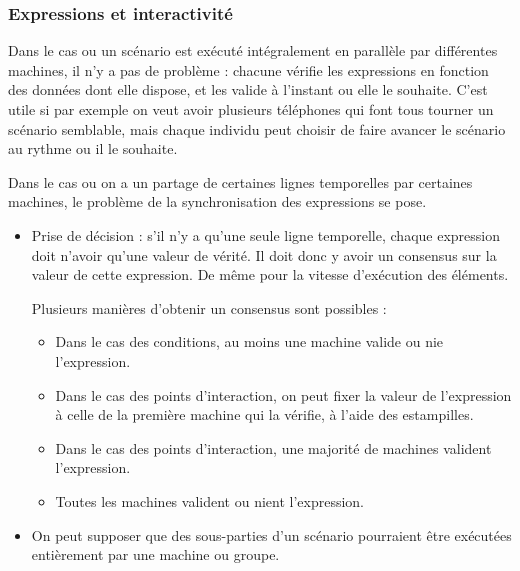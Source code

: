 \documentclass{article}
\begin{document}
\subsubsection{Expressions et interactivité}
Dans le cas ou un scénario est exécuté intégralement en parallèle par différentes machines, il n'y a pas de problème : chacune vérifie les expressions en fonction des données dont elle dispose, et les valide à l'instant ou elle le souhaite. C'est utile si par exemple on veut avoir plusieurs téléphones qui font tous tourner un scénario semblable, mais chaque individu peut choisir de faire avancer le scénario au rythme ou il le souhaite.

Dans le cas ou on a un partage de certaines lignes temporelles par certaines machines, le problème de la synchronisation des expressions se pose.

\begin{itemize}
	\item Prise de décision : s'il n'y a qu'une seule ligne temporelle, chaque expression doit n'avoir qu'une valeur de vérité. Il doit donc y avoir un consensus sur la valeur de cette expression. De même pour la vitesse d'exécution des éléments.
    
    Plusieurs manières d'obtenir un consensus sont possibles : 
    \begin{itemize}
        \item Dans le cas des conditions, au moins une machine valide ou nie l'expression. 
        \item Dans le cas des points d'interaction, on peut fixer la valeur de l'expression à celle de la première machine qui la vérifie, à l'aide des estampilles. %
        \item Dans le cas des points d'interaction, une majorité de machines valident l'expression.
        \item Toutes les machines valident ou nient l'expression.
    \end{itemize}

	\item On peut supposer que des sous-parties d'un scénario pourraient être exécutées entièrement par une machine ou groupe.
\end{itemize}
\end{document}
